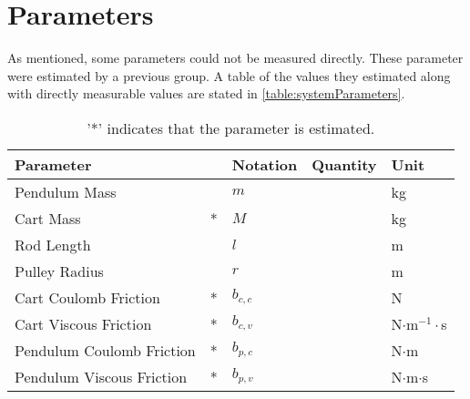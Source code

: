 \section{Parameters}
As mentioned, some parameters could not be measured directly. These parameter were estimated by a previous group. A table of the values they estimated along with directly measurable values are stated in \autoref{table:systemParameters}.

\begin{table}[H]
  \begin{tabular}{|lp{.4cm}|l|l|l|}
    \hline %
    \textbf{Parameter}        &   & \textbf{Notation} & \textbf{Quantity} & \textbf{Unit} \\
    \hline %
    Pendulum Mass             &   &   $m$             &                   &  kg           \\
    \hline %
    Cart Mass                 & * &   $M$             &                   &  kg           \\
    \hline %
    Rod Length                &   &   $l$             &                   &  m            \\
    \hline %
    Pulley Radius             &   &   $r$             &                   &  m            \\
    \hline %
    Cart Coulomb Friction     & * &   $b_{c,c}$       &                   &  N            \\
    \hline %
    Cart Viscous Friction     & * &   $b_{c,v}$       &                   &  N$\cdot$m$^{-1}\cdot$s \\
    \hline %
    Pendulum Coulomb Friction & * &   $b_{p,c}$       &                   &  N$\cdot$m              \\
    \hline %
    Pendulum Viscous Friction & * &   $b_{p,v}$       &                   &  N$\cdot$m$\cdot$s      \\
    \hline %
  \end{tabular}
  \caption{'*' indicates that the parameter is estimated.\label{table:systemParameters}}
\end{table}

